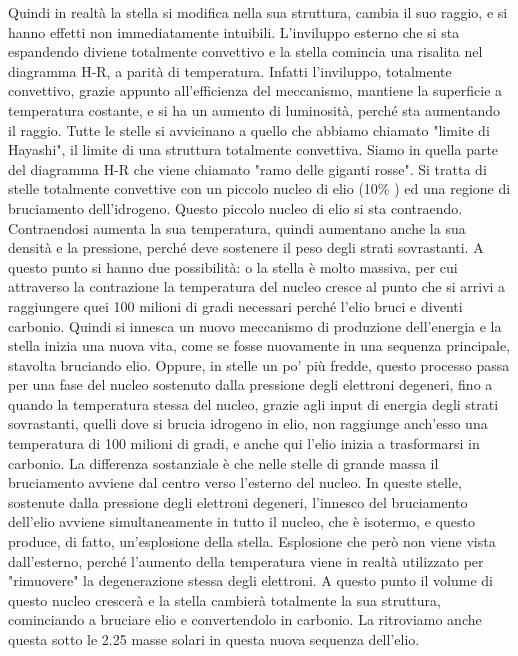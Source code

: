 \documentclass[a4paper,11pt]{article}
\begin{document}
Quindi in realtà la stella si modifica nella sua struttura, cambia il suo raggio, e si hanno effetti non immediatamente intuibili. L'inviluppo esterno che si sta espandendo diviene totalmente convettivo e la stella comincia una risalita nel diagramma H-R, a parità di temperatura. Infatti l'inviluppo, totalmente convettivo, grazie appunto all'efficienza del meccanismo, mantiene la superficie a temperatura costante, e si ha un aumento di luminosità, perché sta aumentando il raggio. Tutte le stelle si avvicinano a quello che abbiamo chiamato "limite di Hayashi", il limite di una struttura totalmente convettiva. Siamo in quella parte del diagramma H-R che viene chiamato "ramo delle giganti rosse". Si tratta di stelle totalmente convettive con un piccolo nucleo di elio (10\% ) ed una regione di bruciamento dell'idrogeno. Questo piccolo nucleo di elio si sta contraendo. Contraendosi aumenta la sua temperatura, quindi aumentano anche la sua densità e la pressione, perché deve sostenere il peso degli strati sovrastanti. A questo punto si hanno due possibilità: o la stella è molto massiva, per cui attraverso la contrazione la temperatura del nucleo cresce al punto che si arrivi a raggiungere quei 100 milioni di gradi necessari perché l'elio bruci e diventi carbonio. Quindi si innesca un nuovo meccanismo di produzione dell'energia e la stella inizia una nuova vita, come se fosse nuovamente in una sequenza principale, stavolta bruciando elio. Oppure, in stelle un po' più fredde, questo processo passa per una fase del nucleo sostenuto dalla pressione degli elettroni degeneri, fino a quando la temperatura stessa del nucleo, grazie agli input di energia degli strati sovrastanti, quelli dove si brucia idrogeno in elio, non raggiunge anch'esso una temperatura di 100 milioni di gradi, e anche qui l'elio inizia a trasformarsi in carbonio. La differenza sostanziale è che nelle stelle di grande massa il bruciamento avviene dal centro verso l'esterno del nucleo. In queste stelle, sostenute dalla pressione degli elettroni degeneri, l'innesco del bruciamento dell'elio avviene simultaneamente in tutto il nucleo, che è isotermo, e questo produce, di fatto, un'esplosione della stella. Esplosione che però non viene vista dall'esterno, perché l'aumento della temperatura viene in realtà utilizzato per "rimuovere" la degenerazione stessa degli elettroni. A questo punto il volume di questo nucleo crescerà e la stella cambierà totalmente la sua struttura, cominciando a bruciare elio e convertendolo in carbonio. La ritroviamo anche questa sotto le 2.25 masse solari in questa nuova sequenza dell'elio. 
\end{document}
